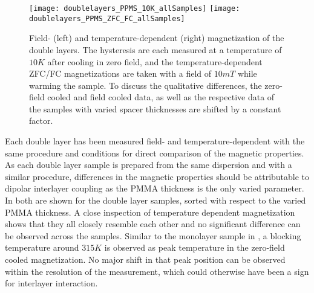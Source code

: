 \documentclass[\main/dresen_thesis.tex]{subfiles}
\begin{document}
  \label{sec:doubleLayers:vsm}

  \begin{figure}[tb]
    \centering
    \texttt{[image: doublelayers\_PPMS\_10K\_allSamples]}
    \texttt{[image: doublelayers\_PPMS\_ZFC\_FC\_allSamples]}
    \caption{\label{fig:doubleLayers:zfcFCData}Field- (left) and temperature-dependent (right) magnetization of the double layers. The hysteresis are each measured at a temperature of $10 \unit{K}$ after cooling in zero field, and the temperature-dependent ZFC/FC magnetizations are taken with a field of $10 \unit{mT}$ while warming the sample.  To discuss the qualitative differences, the zero-field cooled and field cooled data, as well as the respective data of the samples with varied spacer thicknesses are shifted by a constant factor.}
  \end{figure}
  Each double layer has been measured field- and temperature-dependent with the same procedure and conditions for direct comparison of the magnetic properties.
  As each double layer sample is prepared from the same dispersion and with a similar procedure, differences in the magnetic properties should be attributable to dipolar interlayer coupling as the PMMA thickness is the only varied parameter.
  In  both are shown for the double layer samples, sorted with respect to the varied PMMA thickness.
  A close inspection of temperature dependent magnetization shows that they all closely resemble each other and no significant difference can be observed across the samples.
  Similar to the monolayer sample in , a blocking temperature around $315 \unit{K}$ is observed as peak temperature in the zero-field cooled magnetization.
  No major shift in that peak position can be observed within the resolution of the measurement, which could otherwise have been a sign for interlayer interaction.
\end{document}
